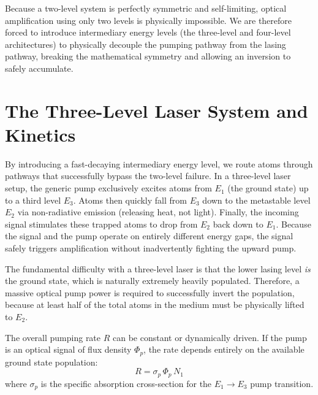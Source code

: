 Because a two-level system is perfectly symmetric and self-limiting, optical amplification using only two levels is physically impossible. We are therefore forced to introduce intermediary energy levels (the three-level and four-level architectures) to physically decouple the pumping pathway from the lasing pathway, breaking the mathematical symmetry and allowing an inversion to safely accumulate.

\section{The Three-Level Laser System and Kinetics}

By introducing a fast-decaying intermediary energy level, we route atoms through pathways that successfully bypass the two-level failure. In a three-level laser setup, the generic pump exclusively excites atoms from $E_1$ (the ground state) up to a third level $E_3$. Atoms then quickly fall from $E_3$ down to the metastable level $E_2$ via non-radiative emission (releasing heat, not light). Finally, the incoming signal stimulates these trapped atoms to drop from $E_2$ back down to $E_1$. Because the signal and the pump operate on entirely different energy gaps, the signal safely triggers amplification without inadvertently fighting the upward pump.

The fundamental difficulty with a three-level laser is that the lower lasing level \emph{is} the ground state, which is naturally extremely heavily populated. Therefore, a massive optical pump power is required to successfully invert the population, because at least half of the total atoms in the medium must be physically lifted to $E_2$.

The overall pumping rate $R$ can be constant or dynamically driven. If the pump is an optical signal of flux density $\Phi_p$, the rate depends entirely on the available ground state population:
\begin{equation*}
    R = \sigma_p\,\Phi_p\,N_1
\end{equation*}
where $\sigma_p$ is the specific absorption cross-section for the $E_1 \to E_3$ pump transition.


